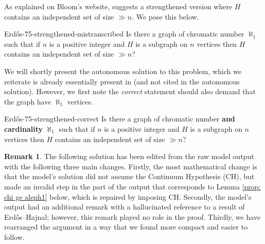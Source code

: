 \documentclass{article}
\theoremstyle{plain}
\theoremstyle{definition}
\newtheorem{remark}{Remark}[section]
\begin{document}
  As explained on Bloom's website, \cite{Erd95} suggests a strengthened version where $H$ contains an independent set of size $ \gg n$. We pose this below. 
\begin{problem}{Erd\H{o}s-75-strengthened-mistranscribed}
    Is there a graph of chromatic number $\aleph_1$ such that if $n$ is a positive integer and $H$ is a subgraph on $n$ vertices then $H$ contains an independent set of size $\gg n$?
\end{problem}

We will shortly present the autonomous solution to this problem, which we reiterate is already essentially present in \cite{EHS82} (and not cited in the autonomous solution). However, we first note the \emph{correct} statement should also demand that the graph have $\aleph_1$ vertices. 

\begin{problem}{Erd\H{o}s-75-strengthened-correct}
    Is there a graph of chromatic number \textbf{and cardinality} $\aleph_1$ such that if $n$ is a positive integer and $H$ is a subgraph on $n$ vertices then $H$ contains an independent set of size $\gg n$?
\end{problem}

  
\begin{remark}
The following solution has been edited from the raw model output with the following three main changes. Firstly, the most mathematical change is that the model's solution did not assume the Continuum Hypothesis (CH), but made an invalid step in the part of the output that corresponds to Lemma \ref{prop: chi ge aleph1} below, which is repaired by imposing CH. Secondly, the model's output had an additional remark with a hallucinated reference to a result of Erd\H{o}s--Hajnal; however, this remark played no role in the proof. Thirdly, we have rearranged the argument in a way that we found more compact and easier to follow. 
\end{remark}
\end{document}
